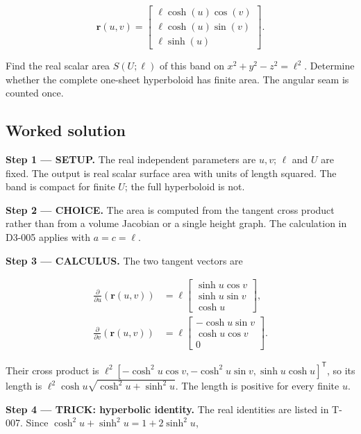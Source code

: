 \documentclass[11pt,oneside,openany]{book}
\begin{document}
\[
\mathbf r(u,v)=\begin{bmatrix}\ell\cosh(u)\cos(v)\\\ell\cosh(u)\sin(v)\\\ell\sinh(u)\end{bmatrix}.
\]

Find the real scalar area \(S(U;\ell)\) of this band on \(x^2+y^2-z^2=\ell^2\). Determine whether the complete one-sheet hyperboloid has finite area. The angular seam is counted once.
\subsection*{Worked solution}

\textbf{Step 1 --- SETUP.} The real independent parameters are \(u,v\); \(\ell\) and \(U\) are fixed. The output is real scalar surface area with units of length squared. The band is compact for finite \(U\); the full hyperboloid is not.

\begin{ChoiceStep}
\textbf{Step 2 --- CHOICE.} The area is computed from the tangent cross product rather than from a volume Jacobian or a single height graph. The calculation in D3-005 applies with \(a=c=\ell\).

\end{ChoiceStep}
\textbf{Step 3 --- CALCULUS.} The two tangent vectors are

\[
\begin{aligned}
\frac{\partial}{\partial u}\left(\mathbf r(u,v)\right)&=\ell\begin{bmatrix}\sinh u\cos v\\\sinh u\sin v\\\cosh u\end{bmatrix},\\
\frac{\partial}{\partial v}\left(\mathbf r(u,v)\right)&=\ell\begin{bmatrix}-\cosh u\sin v\\\cosh u\cos v\\0\end{bmatrix}.
\end{aligned}
\]

Their cross product is \(\ell^2[-\cosh^2u\cos v,-\cosh^2u\sin v,\sinh u\cosh u]^{\mathsf T}\), so its length is \(\ell^2\cosh u\sqrt{\cosh^2u+\sinh^2u}\). The length is positive for every finite \(u\).

\begingroup\color{TrickPurple}
\textbf{Step 4 --- TRICK: hyperbolic identity.} The real identities are listed in T-007. Since \(\cosh^2u+\sinh^2u=1+2\sinh^2u\),
\end{document}

